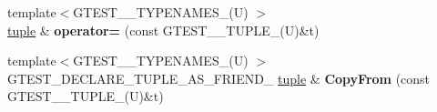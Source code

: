 \begin{DoxyCompactItemize}
{\footnotesize template$<$G\+T\+E\+S\+T\+\_\+\_\+\+T\+Y\+P\+E\+N\+A\+M\+E\+S\+\_\+(\+U) $>$ }\\\mbox{\hyperlink{classstd_1_1tr1_1_1tuple}{tuple}} \& {\bfseries operator=} (const G\+T\+E\+S\+T\+\_\+\_\+\+T\+U\+P\+L\+E\+\_\+(U)\&t)
\item 
\mbox{\label{classstd_1_1tr1_1_1tuple_a3d06fb121d18b6e1c10d14f9e966618d}} 
{\footnotesize template$<$G\+T\+E\+S\+T\+\_\+\_\+\+T\+Y\+P\+E\+N\+A\+M\+E\+S\+\_\+(\+U) $>$ }\\G\+T\+E\+S\+T\+\_\+\+D\+E\+C\+L\+A\+R\+E\+\_\+\+T\+U\+P\+L\+E\+\_\+\+A\+S\+\_\+\+F\+R\+I\+E\+N\+D\+\_\+ \mbox{\hyperlink{classstd_1_1tr1_1_1tuple}{tuple}} \& {\bfseries Copy\+From} (const G\+T\+E\+S\+T\+\_\+\_\+\+T\+U\+P\+L\+E\+\_\+(U)\&t)
\end{DoxyCompactItemize}
